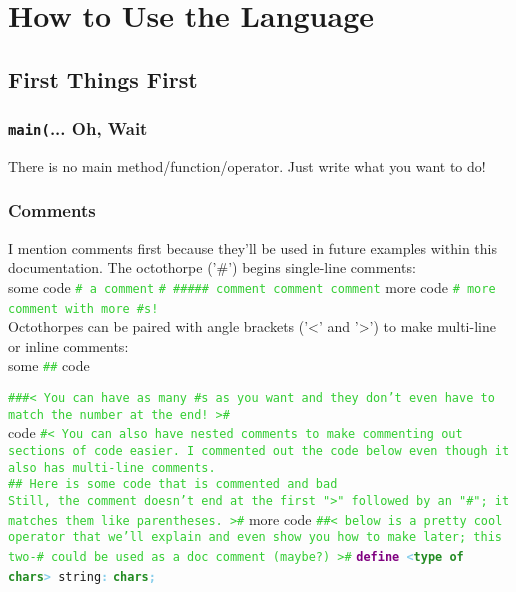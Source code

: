 \documentclass{article}
\newcommand{\English}{\textbackslash{}English}				%
\newcommand{\secl}[1]{\section{#1}\label{sec:#1}}
\newcommand{\ssecl}[1]{\subsection{#1}\label{ssec:#1}}
\newcommand{\sssecl}[1]{\subsubsection{#1}\label{sssec:#1}}
\newcommand{\codecomment}[1]{\texttt{\textcolor{LimeGreen}{#1}}}
\newcommand{\commentline}[1]{\codecomment{\# #1}}
\newcommand{\type}[1]{\texttt{\textcolor{ForestGreen}{\textbf{#1}}}}
\newcommand{\keyop}[1]{\texttt{\textcolor{Purple}{\textbf{#1}}}}
\newcommand{\defpunct}[1]{\texttt{\textcolor{SkyBlue}{\textbf{#1}}}}
\newcommand{\define}[2]{\texttt{\keyop{define} \defpunct{<}#1\defpunct{>} #2\defpunct{:}}}
\newenvironment{code}[0]
{\ttfamily{}				%
\setlength\parindent{0cm}	%
~\\}
{\setlength\parindent{1cm}
~\\}
\begin{document}
\setlength\parindent{1cm}								%

\tableofcontents
\newpage

\obeylines												%

\begin{comment}
\secl{Introduction: What, Why, and How?}
\ssecl{What is \English{}?}

\ssecl{What makes it different?}

\ssecl{What is good about these differences?}
\ssecl{How are these differences possible?}

\end{comment}
\secl{How to Use the Language}

\ssecl{First Things First}
\sssecl{\texttt{main(}... Oh, Wait}
\indent There is no main method/function/operator. Just write what you want to do!
\sssecl{Comments}
\indent I mention comments first because they'll be used in future examples within this documentation.
\indent The octothorpe ('\#') begins single-line comments:
\begin{code}
some code		\commentline{a comment}
\commentline{\#\#\#\#\# comment comment comment}
more code		\commentline{more comment with more \#s!}
\end{code}
\indent Octothorpes can be paired with angle brackets ('<' and '>') to make multi-line or inline comments:
\begin{code}
some \codecomment{\#< awesome >\#} code

\codecomment{\#\#\#< You can have as many \#s as you want and they don't
even have to match the number at the end! >\#\\}
code
\codecomment{\#< You can also have nested comments to make commenting out sections of code easier. 
I commented out the code below even though it also has multi-line comments.\\

\#< This is a comment >\# Here is some code that is commented and bad\\

Still, the comment doesn't end at the first ">" followed by an "\#"; it matches them like parentheses. 
>\#}
more code
\codecomment{\#\#< below is a pretty cool operator that we'll explain and even show you how to make later; this two-\# could be used as a doc comment (maybe?) >\#}
\define{\type{type of chars}}{string}
\qquad\type{chars}\defpunct{;}
\end{code}
\end{document}
